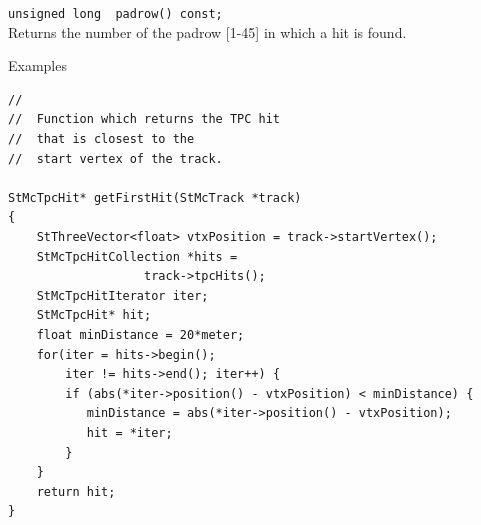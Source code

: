 \begin{Entry}
    \verb+unsigned long  padrow() const;+\\
    Returns the number of the padrow [1-45] in which a hit is found. 

\item[Examples]  
{\footnotesize
\begin{verbatim}
//
//  Function which returns the TPC hit
//  that is closest to the
//  start vertex of the track.

StMcTpcHit* getFirstHit(StMcTrack *track)
{
    StThreeVector<float> vtxPosition = track->startVertex();
    StMcTpcHitCollection *hits =
                   track->tpcHits();
    StMcTpcHitIterator iter;
    StMcTpcHit* hit;
    float minDistance = 20*meter;
    for(iter = hits->begin();
        iter != hits->end(); iter++) {
        if (abs(*iter->position() - vtxPosition) < minDistance) {
           minDistance = abs(*iter->position() - vtxPosition);
           hit = *iter;
        }
    }
    return hit;
}

\end{verbatim}
}%
\end{Entry}
\clearpage
%
%

